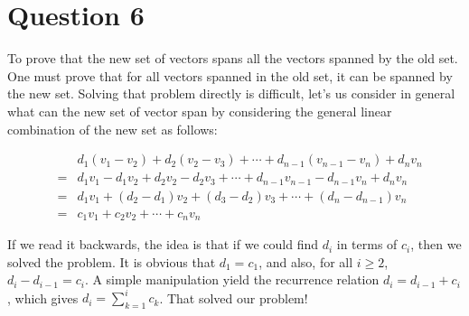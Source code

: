 \section*{Question 6}
To prove that the new set of vectors spans all the vectors spanned by the old set. One must prove that for all vectors spanned in the old set, it can be spanned by the new set. Solving that problem directly is difficult, let's us consider in general what can the new set of vector span by considering the general linear combination of the new set as follows:

\begin{eqnarray*}
  & & d_1 (v_1 - v_2) + d_2 (v_2 - v_3) + \cdots + d_{n-1}(v_{n-1} - v_n) + d_n v_n \\
  &=& d_1 v_1 - d_ 1 v_2 + d_2 v_2 - d_2 v_3 + \cdots + d_{n-1} v_{n-1} - d_{n-1} v_n + d_n v_n \\
  &=& d_1 v_1 + (d_2 - d_1) v_2 + (d_3 - d_2) v_3 + \cdots + (d_n - d_{n-1}) v_n \\
  &=& c_1 v_1 + c_2 v_2 + \cdots + c_n v_n
\end{eqnarray*}

If we read it backwards, the idea is that if we could find $ d_i $ in terms of $ c_i $, then we solved the problem. It is obvious that $ d_1 = c_1 $, and also, for all $i \ge 2 $, $ d_i - d_{i-1} = c_i $. A simple manipulation yield the recurrence relation $ d_i = d_{i-1} + c_i $, which gives $ d_i = \sum\limits_{k=1}^{i}{c_k} $. That solved our problem!

